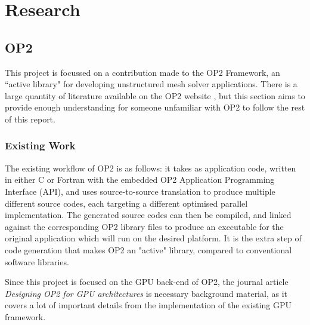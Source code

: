 
\section{Research}
\label{s:research}
\vspace{-2em}
\subsection{OP2}
This project is focussed on a contribution made to the OP2 Framework, an ``active library" \cite{op2main} for developing unstructured mesh solver applications. There is a large quantity of literature available on the OP2 website \cite{op-dsl}, but this section aims to provide enough understanding for someone unfamiliar with OP2 to follow the rest of this report.
\subsubsection{Existing Work}
The existing workflow of OP2 is as follows: it takes as application code, written in either C or Fortran with the embedded OP2 Application Programming Interface (API), and uses source-to-source translation to produce multiple different source codes, each targeting a different optimised parallel implementation. The generated source codes can then be compiled, and linked against the corresponding OP2 library files to produce an executable for the original application which will run on the desired platform. It is the extra step of code generation that makes OP2 an "active" library, compared to conventional software libraries.
\par
Since this project is focused on the GPU back-end of OP2, the journal article \textit{Designing OP2 for GPU architectures} \cite{gpudesign} is necessary background material, as it covers a lot of important details from the implementation of the existing GPU framework.

